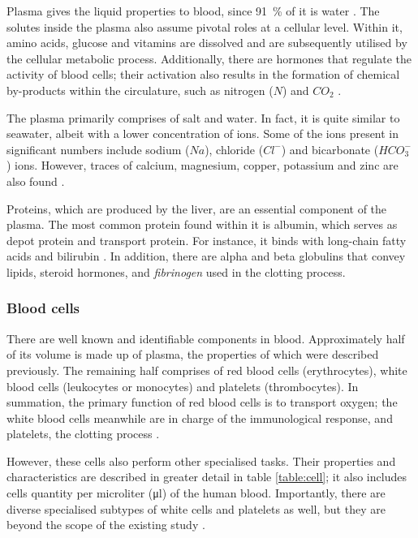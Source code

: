 Plasma gives the liquid properties to blood, since \SI{91}{\percent} of it is water \cite{scanlon2014essentials}. The solutes inside the plasma also assume pivotal roles at a cellular level. Within it, amino acids, glucose and vitamins are dissolved and are subsequently utilised by the cellular metabolic process. Additionally, there are hormones that regulate the activity of blood cells; their activation also results in the formation of chemical by-products within the circulature, such as nitrogen ($N$) and $CO_2$ \cite{Hall:2015aa, scanlon2014essentials}.

The plasma primarily comprises of salt and water. In fact, it is quite similar to seawater, albeit with a lower concentration of ions. Some of the ions present in significant numbers include sodium ($Na$), chloride ($Cl^-$) and bicarbonate ($HCO_3^-$) ions. However, traces of calcium, magnesium, copper, potassium and zinc are also found \cite{Hall:2015aa}.

Proteins, which are produced by the liver, are an essential component of the plasma. The most common protein found within it is albumin, which serves as depot protein and transport protein. For instance, it binds with long-chain fatty acids and bilirubin \cite{kragh1981molecular}. In addition, there are alpha and beta globulins that convey lipids, steroid hormones, and \textit{fibrinogen} used in the clotting process.

\subsubsection{Blood cells}
There are well known and identifiable components in blood. Approximately half of its volume is made up of plasma, the properties of which were described previously. The remaining half   comprises of red blood cells (erythrocytes), white blood cells (leukocytes or monocytes) and platelets (thrombocytes)\cite{scanlon2014essentials}. In summation, the primary function of red blood cells is to transport oxygen; the white blood cells meanwhile are in charge of the immunological response, and platelets, the clotting process \cite{Hall:2015aa}.

However, these cells also perform other specialised tasks. Their properties and characteristics are described in greater detail in table \ref{table:cell}; it also includes cells quantity per microliter (\si{\micro\litre}) of the human blood. Importantly, there are diverse specialised subtypes of white cells and platelets as well, but they are beyond the scope of the existing study \cite{Hall:2015aa}.

